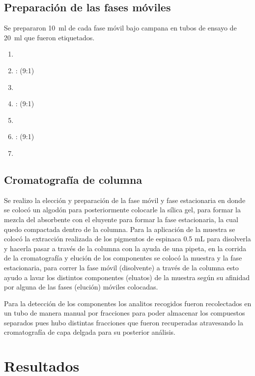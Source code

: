 \documentclass{ITESO-Project}
\begin{document}
\subsection{Preparación de las fases móviles}\label{fases moviles}

Se prepararon \qty{10}{\ml} de cada fase móvil bajo campana en tubos de ensayo de \qty{20}{\ml} que fueron etiquetados.

\begin{enumerate}
    \setlength{\itemsep}{0pt}
    \item {}
    \item {}: (9:1)
    \item {}
    \item {}: (9:1)
    \item {}
    \item {}: (9:1)
    \item {}
\end{enumerate}

\subsection{Cromatografía de columna}\label{cromatografia}

Se realizo la elección y preparación de la fase móvil y fase estacionaria en donde se colocó un algodón para posteriormente colocarle la sílica gel, para formar la mezcla del absorbente con el eluyente para formar la fase estacionaria, la cual quedo compactada dentro de la columna. Para la aplicación de la muestra se colocó la extracción realizada de los pigmentos de espinaca 0.5 mL para disolverla y hacerla pasar a través de la columna con la ayuda de una pipeta, en la corrida de la cromatografía y elución de los componentes se colocó la muestra y la fase estacionaria, para correr la fase móvil (disolvente) a través de la columna esto ayudo a lavar los distintos componentes (eluatos) de la muestra según su afinidad por alguna de las fases (elución) móviles colocadas.

Para la detección de los componentes los analitos recogidos fueron recolectados en un tubo de manera manual por fracciones para poder almacenar los compuestos separados pues hubo distintas fracciones que fueron recuperadas atravesando la cromatografía de capa delgada para su posterior análisis.

\section{Resultados}\label{resultados}
\end{document}
